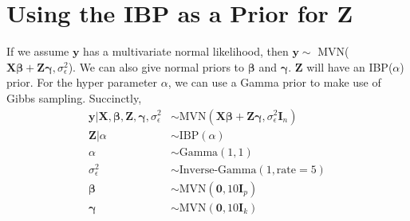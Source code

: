 \documentclass[mathserif]{article}
\newcommand{\m}[1]{\mathbf{\bm{#1}}} %
\begin{document}
\section*{Using the IBP as a Prior for Z}
If we assume $\m{y}$ has a multivariate normal likelihood, then $\m{y \sim }$
MVN($\m{X\beta+Z\gamma},\sigma_\epsilon^2$). We can also give normal priors to
$\m{\beta}$ and $\m{\gamma}$. $\m{Z}$ will have an IBP($ \alpha$) prior. For
the hyper parameter $\alpha$, we can use a Gamma prior to make use of Gibbs
sampling. Succinctly,
\begin{align*}
  \m{y|X,\beta,Z,\gamma,}\sigma_\epsilon^2 &\sim \text{MVN}(\m{X\beta+Z\gamma},\sigma_\epsilon^2\m{I}_n)\\
  \m{Z}|\alpha &\sim \text{IBP}(\alpha)\\
  \alpha &\sim \text{Gamma}(1,1)\\
  \sigma_\epsilon^2 &\sim \text{Inverse-Gamma}(1,\text{rate}=5)\\
  \m{\beta} &\sim \text{MVN}(\m{0},10\m{I}_p)\\
  \m{\gamma} &\sim \text{MVN}(\m{0},10\m{I}_k)
\end{align*}
\end{document}
